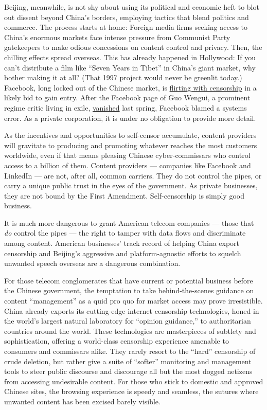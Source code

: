 Beijing, meanwhile, is not shy about using its political and economic
heft to blot out dissent beyond China's borders, employing tactics that
blend politics and commerce. The process starts at home: Foreign media
firms seeking access to China's enormous markets face intense pressure
from Communist Party gatekeepers to make odious concessions on content
control and privacy. Then, the chilling effects spread overseas. This
has already happened in Hollywood: If you can't distribute a film like
``Seven Years in Tibet'' in China's giant market, why bother making it
at all? (That 1997 project would never be greenlit today.) Facebook,
long locked out of the Chinese market, is
\href{https://www.nytimes3xbfgragh.onion/2016/11/22/technology/facebook-censorship-tool-china.html}{flirting
with censorship} in a likely bid to gain entry. After the Facebook page
of Guo Wengui, a prominent regime critic living in exile,
\href{https://www.nytimes3xbfgragh.onion/2017/04/21/technology/guo-wengui-china-facebook-account-suspended.html}{vanished}
last spring, Facebook blamed a systems error. As a private corporation,
it is under no obligation to provide more detail.

As the incentives and opportunities to self-censor accumulate, content
providers will gravitate to producing and promoting whatever reaches the
most customers worldwide, even if that means pleasing Chinese
cyber-commissars who control access to a billion of them. Content
providers --- companies like Facebook and LinkedIn --- are not, after
all, common carriers. They do not control the pipes, or carry a unique
public trust in the eyes of the government. As private businesses, they
are not bound by the First Amendment. Self-censorship is simply good
business.

It is much more dangerous to grant American telecom companies --- those
that \emph{do} control the pipes --- the right to tamper with data flows
and discriminate among content. American businesses' track record of
helping China export censorship and Beijing's aggressive and
platform-agnostic efforts to squelch unwanted speech overseas are a
dangerous combination.

For those telecom conglomerates that have current or potential business
before the Chinese government, the temptation to take behind-the-scenes
guidance on content ``management'' as a quid pro quo for market access
may prove irresistible. China already exports its cutting-edge internet
censorship technologies, honed in the world's largest natural laboratory
for ``opinion guidance,'' to authoritarian countries around the world.
These technologies are masterpieces of subtlety and sophistication,
offering a world-class censorship experience amenable to consumers and
commissars alike. They rarely resort to the ``hard'' censorship of crude
deletion, but rather give a suite of ``softer'' monitoring and
management tools to steer public discourse and discourage all but the
most dogged netizens from accessing undesirable content. For those who
stick to domestic and approved Chinese sites, the browsing experience is
speedy and seamless, the sutures where unwanted content has been excised
barely visible.

